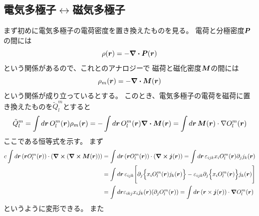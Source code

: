 \documentclass[../master.tex]{subfiles}
\begin{document}
\subsection{電気多極子\(\leftrightarrow\)磁気多極子}
まず初めに電気多極子の電荷密度を置き換えたものを見る。
電荷と分極密度\(\vb*{P}\)の間には
\begin{equation}
    \rho(\vb*{r}) = -\div\vb*{P}(\vb*{r})
\end{equation}
という関係があるので、これとのアナロジーで
磁荷と磁化密度\(\vb*{M}\)の間には
\begin{equation}
    \rho_m(\vb*{r}) = -\div\vb*{M}(\vb*{r})
\end{equation}
という関係が成り立っているとする。
このとき、電気多極子の電荷を磁荷に置き換えたものを\(\tilde{Q}_l^m\)とすると
\begin{align}
    \tilde{Q}_l^m
    = \int d\vb*{r}\, O_l^m(\vb*{r})\rho_m(\vb*{r})
    = -\int d\vb*{r}\, O_l^m(\vb*{r})\div\vb*{M}(\vb*{r})
    = \int d\vb*{r}\, \vb*{M}(\vb*{r})\cdot \nabla O_l^m(\vb*{r})
\end{align}
ここである恒等式を示す。
まず
\begin{equation}\begin{aligned}[b]
    c\int d\vb*{r}\, (\vb*{r}O_l^m(\vb*{r}))\cdot (\curl (\curl\vb*{M}(\vb*{r})))
    &=\int d\vb*{r}\, (\vb*{r}O_l^m(\vb*{r}))\cdot(\curl \vb*{j}(\vb*{r}))
    =\int d\vb*{r}\, \varepsilon_{ijk} x_i O_l^m(\vb*{r}) \partial_j j_k(\vb*{r})\\
    &= \int d\vb*{r}\,\varepsilon_{ijk} \Biggl[\partial_j \Bigl\{ x_i O_l^m(\vb*{r}) j_k(\vb*{r})\Bigr\}
    -  \varepsilon_{ijk}\partial_j\Bigl\{x_i O_l^m(\vb*{r})\Bigr\} j_k(\vb*{r})\Biggr]\\
    &=\int d\vb*{r}\varepsilon_{ikj} x_i j_k(\vb*{r}) (\partial_j O_l^m(\vb*{r}))
    =\int d\vb*{r}\, (\vb*{r}\times\vb*{j}(\vb*{r}))\cdot \grad O_l^m(\vb*{r})
\end{aligned}\end{equation}
というように変形できる。
また
\end{document}
